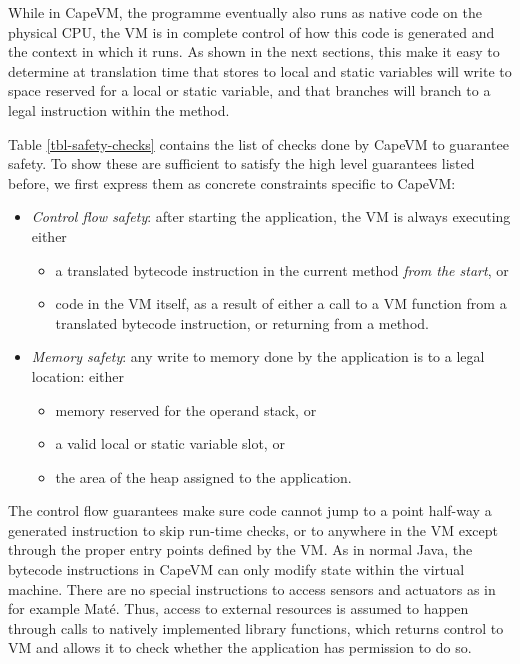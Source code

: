 While in CapeVM, the programme eventually also runs as native code on the physical CPU, the VM is in complete control of how this code is generated and the context in which it runs. As shown in the next sections, this make it easy to determine at translation time that stores to local and static variables will write to space reserved for a local or static variable, and that branches will branch to a legal instruction within the method.

Table \ref{tbl-safety-checks} contains the list of checks done by CapeVM to guarantee safety. To show these are sufficient to satisfy the high level guarantees listed before, we first express them as concrete constraints specific to CapeVM:

\begin{itemize}
    \item \emph{Control flow safety}: after starting the application, the VM is always executing either
        \begin{itemize}
            \item a translated bytecode instruction in the current method \emph{from the start}, or
            \item code in the VM itself, as a result of either a call to a VM function from a translated bytecode instruction, or returning from a method.
        \end{itemize}
    \item \emph{Memory safety}: any write to memory done by the application is to a legal location: either
        \begin{itemize}
            \item memory reserved for the operand stack, or
            \item a valid local or static variable slot, or
            \item the area of the heap assigned to the application.
        \end{itemize}
\end{itemize}

The control flow guarantees make sure code cannot jump to a point half-way a generated instruction to skip run-time checks, or to anywhere in the VM except through the proper entry points defined by the VM. As in normal Java, the bytecode instructions in CapeVM can only modify state within the virtual machine. There are no special instructions to access sensors and actuators as in for example Maté. Thus, access to external resources is assumed to happen through calls to natively implemented library functions, which returns control to VM and allows it to check whether the application has permission to do so.

